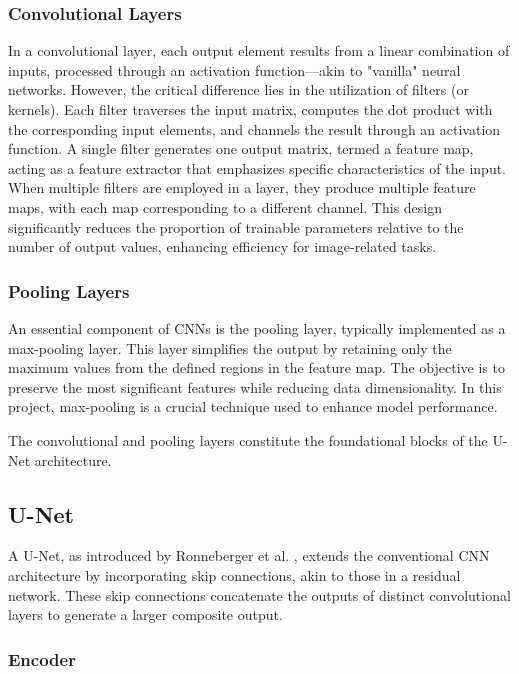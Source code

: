 \documentclass[12pt]{article}
\begin{document}
\subsubsection*{Convolutional Layers}

In a convolutional layer, each output element results from a linear combination of inputs, processed through an activation function—akin to "vanilla" neural networks. However, the critical difference lies in the utilization of filters (or kernels). Each filter traverses the input matrix, computes the dot product with the corresponding input elements, and channels the result through an activation function. 
A single filter generates one output matrix, termed a feature map, acting as a feature extractor that emphasizes specific characteristics of the input. 
When multiple filters are employed in a layer, they produce multiple feature maps, with each map corresponding to a different channel. 
This design significantly reduces the proportion of trainable parameters relative to the number of output values, enhancing efficiency for image-related tasks.

\subsubsection*{Pooling Layers}

An essential component of CNNs is the pooling layer, typically implemented as a max-pooling layer. This layer simplifies the output by retaining only the maximum values from the defined regions in the feature map. The objective is to preserve the most significant features while reducing data dimensionality. In this project, max-pooling is a crucial technique used to enhance model performance.

The convolutional and pooling layers constitute the foundational blocks of the U-Net architecture.

\subsection{U-Net}



A U-Net, as introduced by Ronneberger et al. \cite{ronneberger2015unet}, extends the conventional CNN architecture by incorporating skip connections, akin to those in a residual network. These skip connections concatenate the outputs of distinct convolutional layers to generate a larger composite output.

\subsubsection*{Encoder}
\end{document}
